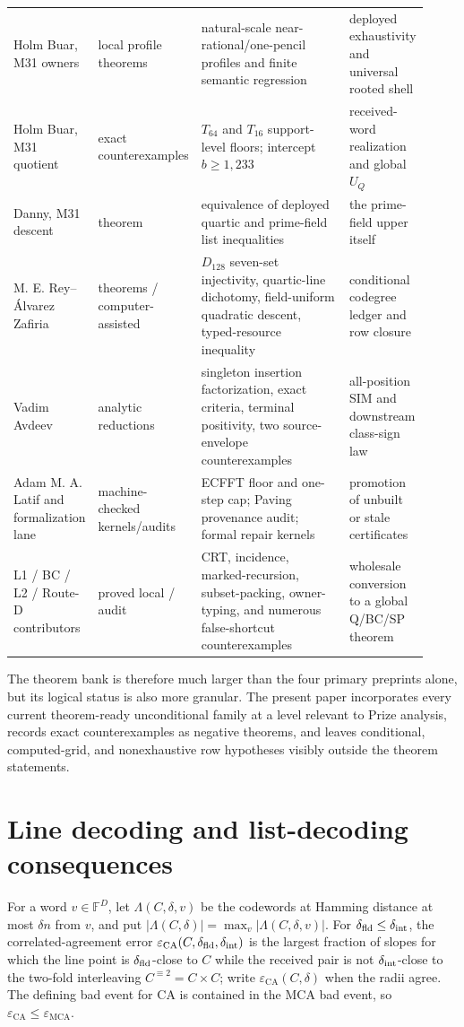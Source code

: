 \documentclass[11pt,a4paper]{amsart}
\numberwithin{equation}{section}
\theoremstyle{remark}
\DeclareMathOperator{\MCA}{MCA}
\DeclareMathOperator{\CA}{CA}
\newcommand{\F}{\mathbb F}
\newcommand{\eps}{\varepsilon}
\newcommand{\abs}[1]{\lvert#1\rvert}
\begin{document}
\begin{longtable}{@{}>{\raggedright\arraybackslash}p{0.15\linewidth}>{\raggedright\arraybackslash}p{0.18\linewidth}>{\raggedright\arraybackslash}p{0.40\linewidth}>{\raggedright\arraybackslash}p{0.19\linewidth}@{}}
Holm Buar, M31 owners & local profile theorems & natural-scale near-rational/one-pencil profiles and finite semantic regression & deployed exhaustivity and universal rooted shell\\
Holm Buar, M31 quotient & exact counterexamples & $T_{64}$ and $T_{16}$ support-level floors; intercept $b\ge1{,}233$ & received-word realization and global $U_Q$\\
Danny, M31 descent & theorem & equivalence of deployed quartic and prime-field list inequalities & the prime-field upper itself\\
M. E. Rey--\'Alvarez Zafiria & theorems / computer-assisted & $D_{128}$ seven-set injectivity, quartic-line dichotomy, field-uniform quadratic descent, typed-resource inequality & conditional codegree ledger and row closure\\
Vadim Avdeev & analytic reductions & singleton insertion factorization, exact criteria, terminal positivity, two source-envelope counterexamples & all-position SIM and downstream class-sign law\\
Adam M. A. Latif and formalization lane & machine-checked kernels/audits & ECFFT floor and one-step cap; Paving provenance audit; formal repair kernels & promotion of unbuilt or stale certificates\\
L1 / BC / L2 / Route-D contributors & proved local / audit & CRT, incidence, marked-recursion, subset-packing, owner-typing, and numerous false-shortcut counterexamples & wholesale conversion to a global Q/BC/SP theorem\\
\bottomrule
\end{longtable}
\normalsize

The theorem bank is therefore much larger than the four primary preprints alone, but its logical status is also more granular.  The present paper incorporates every current theorem-ready unconditional family at a level relevant to Prize analysis, records exact counterexamples as negative theorems, and leaves conditional, computed-grid, and nonexhaustive row hypotheses visibly outside the theorem statements.


\section{Line decoding and list-decoding consequences}

For a word $v\in\F^D$, let $\Lambda(C,\delta,v)$ be the codewords at Hamming distance at most $\delta n$ from $v$, and put $\abs{\Lambda(C,\delta)}=\max_v\abs{\Lambda(C,\delta,v)}$.  For $\delta_{\rm fld}\le\delta_{\rm int}$, the correlated-agreement error $\eps_{\CA}(C,\delta_{\rm fld},\delta_{\rm int})$ is the largest fraction of slopes for which the line point is $\delta_{\rm fld}$-close to $C$ while the received pair is not $\delta_{\rm int}$-close to the two-fold interleaving $C^{\equiv2}=C\times C$; write $\eps_{\CA}(C,\delta)$ when the radii agree.  The defining bad event for CA is contained in the MCA bad event, so $\eps_{\CA}\le\eps_{\MCA}$.
\end{document}
